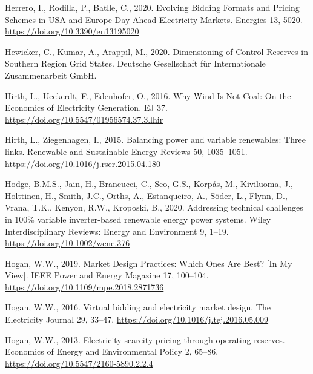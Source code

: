 \documentclass[12pt,a4paper,]{report}
\newlength{\cslhangindent}
\newenvironment{CSLReferences}[2] %
 {%
  \setlength{\parindent}{0pt}
  \ifodd #1 \everypar{\setlength{\hangindent}{\cslhangindent}}\ignorespaces\fi
  \ifnum #2 > 0
  \setlength{\parskip}{#2\baselineskip}
  \fi
 }%
 {}
\begin{document}
\begin{CSLReferences}{1}{0}
\leavevmode{}%
Herrero, I., Rodilla, P., Batlle, C., 2020. Evolving {Bidding Formats}
and {Pricing Schemes} in {USA} and {Europe Day-Ahead Electricity
Markets}. Energies 13, 5020. \url{https://doi.org/10.3390/en13195020}

\leavevmode{}%
Hewicker, C., Kumar, A., Arappil, M., 2020. Dimensioning of {Control
Reserves} in {Southern Region Grid States}. Deutsche Gesellschaft für
Internationale Zusammenarbeit GmbH.

\leavevmode{}%
Hirth, L., Ueckerdt, F., Edenhofer, O., 2016. Why {Wind Is Not Coal}:
{On} the {Economics} of {Electricity Generation}. EJ 37.
\url{https://doi.org/10.5547/01956574.37.3.lhir}

\leavevmode{}%
Hirth, L., Ziegenhagen, I., 2015. Balancing power and variable
renewables: {Three} links. Renewable and Sustainable Energy Reviews 50,
1035--1051. \url{https://doi.org/10.1016/j.rser.2015.04.180}

\leavevmode{}%
Hodge, B.M.S., Jain, H., Brancucci, C., Seo, G.S., Korpås, M.,
Kiviluoma, J., Holttinen, H., Smith, J.C., Orths, A., Estanqueiro, A.,
Söder, L., Flynn, D., Vrana, T.K., Kenyon, R.W., Kroposki, B., 2020.
Addressing technical challenges in 100\% variable inverter-based
renewable energy power systems. Wiley Interdisciplinary Reviews: Energy
and Environment 9, 1--19. \url{https://doi.org/10.1002/wene.376}

\leavevmode{}%
Hogan, W.W., 2019. Market {Design Practices}: {Which Ones Are Best}?
{[}{In My View}{]}. IEEE Power and Energy Magazine 17, 100--104.
\url{https://doi.org/10.1109/mpe.2018.2871736}

\leavevmode{}%
Hogan, W.W., 2016. Virtual bidding and electricity market design. The
Electricity Journal 29, 33--47.
\url{https://doi.org/10.1016/j.tej.2016.05.009}

\leavevmode{}%
Hogan, W.W., 2013. Electricity scarcity pricing through operating
reserves. Economics of Energy and Environmental Policy 2, 65--86.
\url{https://doi.org/10.5547/2160-5890.2.2.4}


\end{CSLReferences}
\end{document}
